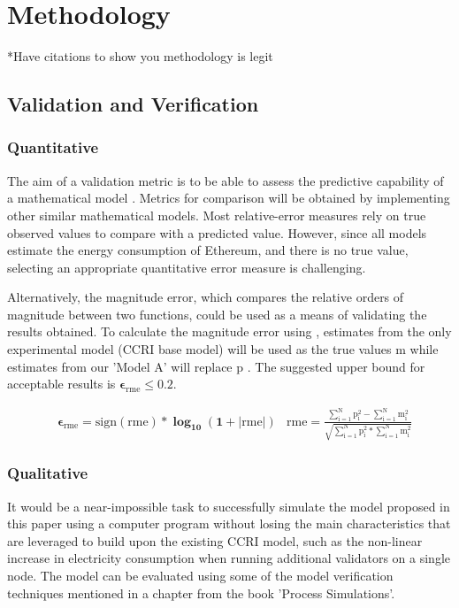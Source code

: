\chapter {Methodology}
*Have citations to show you methodology is legit

\section {Validation and Verification}

\subsection{Quantitative}
\label{MethoologyErrorQuant}
The aim of a validation metric is to be able to assess the predictive capability of a mathematical model \cite{Kat2012ValidationError}. Metrics for comparison will be obtained by implementing other similar mathematical models. Most relative-error measures rely on true observed values to compare with a predicted value. However, since all models estimate the energy consumption of Ethereum, and there is no true value, selecting an appropriate quantitative error measure is challenging. 

Alternatively, the magnitude error, which compares the relative orders of magnitude between two functions, could be used as a means of validating the results obtained. To calculate the magnitude error using , estimates from the only experimental model (CCRI base model) will be used as the true values $\boldsymbol{\mathrm{m}}$ while estimates from our 'Model A' will replace $\boldsymbol{\mathrm{p}}$ \cite{RussellErrorMeasure}. The suggested upper bound for acceptable results is $\boldsymbol{\epsilon_\mathrm{rme} \leq 0.2}$.

\begin{align}
\label{eqn:ErrorMeasureEqn}
    &\boldsymbol{\epsilon_\mathrm{rme} = \mathrm{sign(rme)} * \log_{10} (1 + |\mathrm{rme}|)}
    &\boldsymbol{ \mathrm{rme} = \mathrm{\frac{\mathrm{\sum\limits_{i=1}^{N} p_{i}^{2}} - \mathrm{\sum\limits_{i=1}^{N} m_{i}^{2}}}{\sqrt{\mathrm{\sum\limits_{i=1}^{N} p_{i}^{2}} * \mathrm{\sum\limits_{i=1}^{N} m_{i}^{2}}}}}}
\end{align}

\subsection{Qualitative}
\label{QualModelEvalMEthodology}
 It would be a near-impossible task to successfully simulate the model proposed in this paper using a computer program without losing the main characteristics that are leveraged to build upon the existing CCRI model, such as the non-linear increase in electricity consumption when running additional validators on a single node. The model can be evaluated using some of the model verification techniques mentioned in a chapter \cite{Al-Aomar2015ModelTechniques} from the book 'Process Simulations'.

